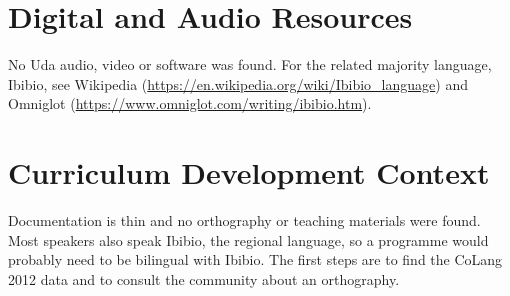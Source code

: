 \documentclass[12pt]{article}
\begin{document}
\section{Digital and Audio Resources}
No Uda audio, video or software was found. For the related majority language, Ibibio, see Wikipedia (\url{https://en.wikipedia.org/wiki/Ibibio_language}) and Omniglot (\url{https://www.omniglot.com/writing/ibibio.htm}).

\section{Curriculum Development Context}
Documentation is thin and no orthography or teaching materials were found. Most speakers also speak Ibibio, the regional language, so a programme would probably need to be bilingual with Ibibio. The first steps are to find the CoLang 2012 data and to consult the community about an orthography.
\end{document}
